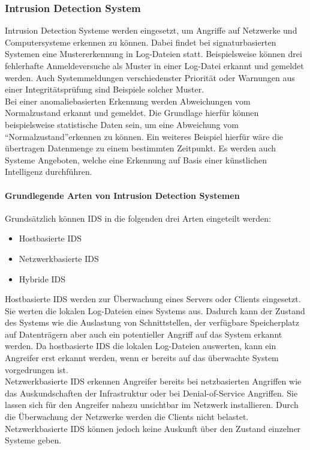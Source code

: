 \newpage
\subsubsection{Intrusion Detection System}

Intrusion Detection Systeme werden eingesetzt, um Angriffe auf Netzwerke und Computersysteme erkennen zu können. Dabei findet bei signaturbasierten Systemen eine Mustererkennung in Log-Dateien statt. Beispielsweise können drei fehlerhafte Anmeldeversuche als Muster in einer Log-Datei erkannt und gemeldet werden. Auch Systemmeldungen verschiedenster Priorität oder Warnungen aus einer Integritätsprüfung sind Beispiele solcher Muster.\\
Bei einer anomaliebasierten Erkennung werden Abweichungen vom Normalzustand erkannt und gemeldet. Die Grundlage hierfür können beispielsweise statistische Daten sein, um eine Abweichung vom "`Normalzustand"'erkennen zu können. Ein weiteres Beispiel hierfür wäre die übertragen Datenmenge zu einem bestimmten Zeitpunkt. Es werden auch Systeme Angeboten, welche eine Erkennung auf Basis einer künstlichen Intelligenz durchführen.   

\paragraph{Grundlegende Arten von Intrusion Detection Systemen}
Grundsätzlich können \ac{IDS} in die folgenden drei Arten eingeteilt werden:

\begin{itemize}
\item Hostbasierte \ac{IDS}
\item Netzwerkbasierte \ac{IDS}
\item Hybride \ac{IDS}
\end{itemize}

\noindent Hostbasierte \ac{IDS} werden zur Überwachung eines Servers oder Clients eingesetzt. Sie werten die lokalen Log-Dateien eines Systems aus. Dadurch kann der Zustand des Systems wie die Auslastung von Schnittstellen, der verfügbare Speicherplatz auf Datenträgern aber auch ein potentieller Angriff auf das System erkannt werden. Da hostbasierte \ac{IDS} die lokalen Log-Dateien auswerten, kann ein Angreifer erst erkannt werden, wenn er bereits auf das überwachte System vorgedrungen ist.\\ 

\noindent Netzwerkbasierte \ac{IDS} erkennen Angreifer bereits bei netzbasierten Angriffen wie das Auskundschaften der Infrastruktur oder bei Denial-of-Service Angriffen. Sie lassen sich für den Angreifer nahezu unsichtbar im Netzwerk installieren. Durch die Überwachung der Netzwerke werden die Clients nicht belastet. Netzwerkbasierte \ac{IDS} können jedoch keine Auskunft über den Zustand einzelner Systeme geben.\\ 

